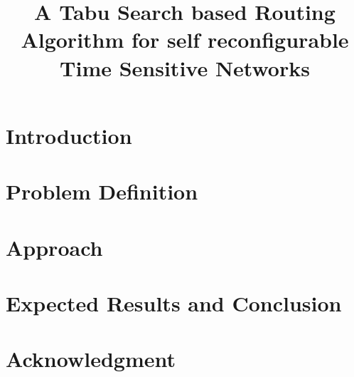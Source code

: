 \documentclass[conference,a4paper,twocolumn]{IEEEtran}
\begin{document}
\title{A Tabu Search based Routing Algorithm for self reconfigurable Time Sensitive Networks}

\author{
}


\newcommand{\Offset}[1]{O_{#1}}
\newcommand{\Period}[1]{T_{#1}}
\newcommand{\Wcet}[1]{C_{#1}}
\newcommand{\Deadline}[1]{D_{#1}}
\newcommand{\hep}[1]{\operatorname{hep}(#1)}
\newcommand{\lep}[1]{\operatorname{lep}(#1)}
\newcommand{\hp}[1]{\operatorname{hp}(#1)}
\newcommand{\lp}[1]{\operatorname{lp}(#1)}
\newcommand{\priority}[1]{\operatorname{pr}(#1)}
\newcommand{\speed}{\operatorname{sp}}

\newcommand{\equals}{\stackrel{\mathrm{def}}{=}}
\newcommand{\timeres}{\Gamma_{res}}
\newcommand{\pluseq}{\mathrel{+}=}

\maketitle


\begin{abstract}

\end{abstract}


\section{Introduction}
\label{sec:intro}

%
\section{Problem Definition}
\label{sec:problem}

%
\section{Approach}
\label{sec:preemption}

%
%
%
\section{Expected Results and Conclusion}
\label{sec:conclusion}

%
\section*{Acknowledgment}
\label{sec:acknowledgment}



 

\balance 
\end{document}

